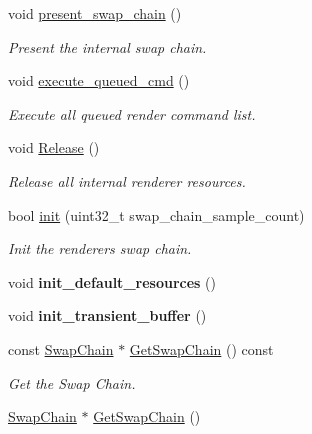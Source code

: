 \begin{DoxyCompactItemize}
void \hyperlink{classDXRenderer_a9c8fd9abd296101a41ae021057810428}{present\+\_\+swap\+\_\+chain} ()
\begin{DoxyCompactList}\small\item\em Present the internal swap chain. \end{DoxyCompactList}\item 
\mbox{\label{classDXRenderer_a32e5bf490798b8135bdd3b9011c47a65}} 
void \hyperlink{classDXRenderer_a32e5bf490798b8135bdd3b9011c47a65}{execute\+\_\+queued\+\_\+cmd} ()
\begin{DoxyCompactList}\small\item\em Execute all queued render command list. \end{DoxyCompactList}\item 
\mbox{\label{classDXRenderer_a9678630e33b952041223b960453a70d6}} 
void \hyperlink{classDXRenderer_a9678630e33b952041223b960453a70d6}{Release} ()
\begin{DoxyCompactList}\small\item\em Release all internal renderer resources. \end{DoxyCompactList}\item 
bool \hyperlink{classDXRenderer_a3ac6805cd3b999b5a8546c36e0cb7e2c}{init} (uint32\+\_\+t swap\+\_\+chain\+\_\+sample\+\_\+count)
\begin{DoxyCompactList}\small\item\em Init the renderer\textquotesingle{}s swap chain. \end{DoxyCompactList}\item 
\mbox{\label{classDXRenderer_ac907448e814751eb71f3a06e8c011d23}} 
void {\bfseries init\+\_\+default\+\_\+resources} ()
\item 
\mbox{\label{classDXRenderer_a0d570933d5a913a98993ea7cd5bc657f}} 
void {\bfseries init\+\_\+transient\+\_\+buffer} ()
\item 
const \hyperlink{structSwapChain}{Swap\+Chain} $\ast$ \hyperlink{classDXRenderer_a17b919b6970a81fb3f1ddc62d368d0bb}{Get\+Swap\+Chain} () const
\begin{DoxyCompactList}\small\item\em Get the Swap Chain. \end{DoxyCompactList}\item 
\hyperlink{structSwapChain}{Swap\+Chain} $\ast$ \hyperlink{classDXRenderer_a570a2b13bad1619410193226a2ae933b}{Get\+Swap\+Chain} ()

\end{DoxyCompactItemize}
